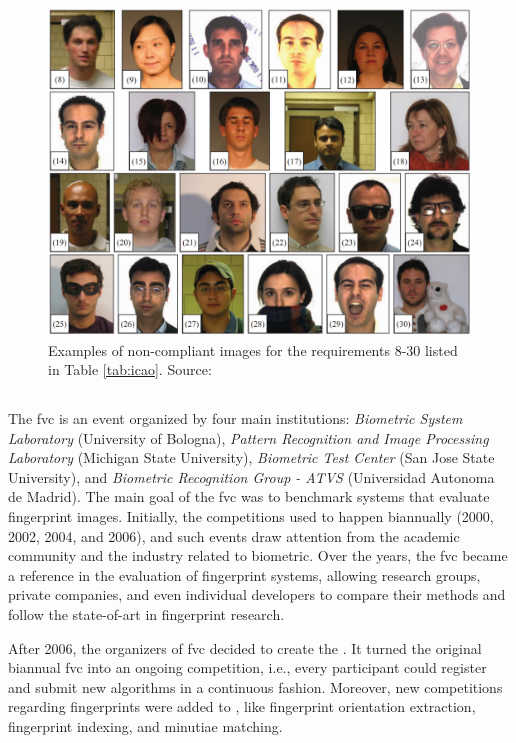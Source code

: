 \begin{figure}[ht]
\centering
\includegraphics[width=\linewidth]{images/icao.png}
\caption{Examples of non-compliant images for the requirements 8-30 listed in Table \ref{tab:icao}. Source: \cite{maltoni2009biolab}}
\label{fig:icao}
\end{figure}

\subsection{\fvcongoing} \label{sec:fvcongoing}

The \acf{fvc} is an event organized by four main institutions: \textit{Biometric System Laboratory} (University of Bologna), \textit{Pattern Recognition and Image Processing Laboratory} (Michigan State University), \textit{Biometric Test Center} (San Jose State University), and \textit{Biometric Recognition Group - ATVS} (Universidad Autonoma de Madrid). The main goal of the \acs{fvc} was to benchmark systems that evaluate fingerprint images. Initially, the competitions used to happen biannually (2000, 2002, 2004, and 2006), and such events draw attention from the academic community and the industry related to biometric. Over the years, the \acs{fvc} became a reference in the evaluation of fingerprint systems, allowing research groups, private companies, and even individual developers to compare their methods and follow the state-of-art in fingerprint research.

After 2006, the organizers of \acs{fvc} decided to create the \fvcongoing. It turned the original biannual \acs{fvc} into an ongoing competition, i.e., every participant could register and submit new algorithms in a continuous fashion. Moreover, new competitions regarding fingerprints were added to \fvcongoing, like fingerprint orientation extraction, fingerprint indexing, and minutiae matching.

